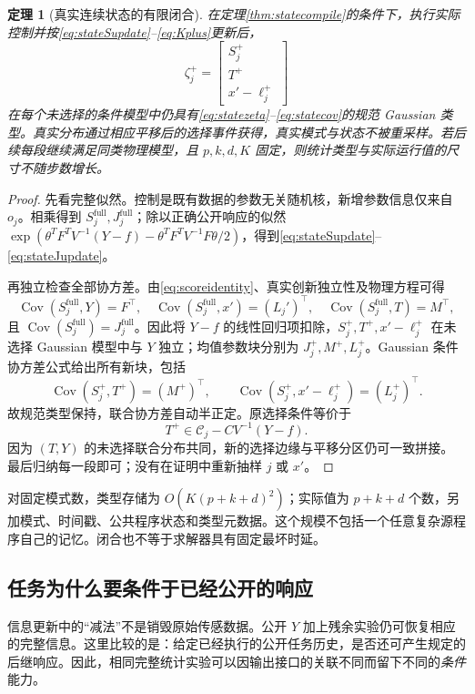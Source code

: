 \documentclass[UTF8,fontset=fandol,11pt,a4paper]{ctexart}
\DeclareMathOperator{\Cov}{Cov}\DeclareMathOperator{\im}{im}\DeclareMathOperator{\rank}{rank}
\newtheorem{theorem}{定理}[section]\newtheorem{lemma}[theorem]{引理}
\theoremstyle{definition}\newtheorem{definition}[theorem]{定义}\newtheorem{assumption}[theorem]{条件}
\numberwithin{equation}{section}
\begin{document}
\begin{theorem}[真实连续状态的有限闭合]
\label{thm:stateclosure}
在定理\ref{thm:statecompile}的条件下，执行实际控制并按\eqref{eq:stateSupdate}--\eqref{eq:Kplus}更新后，
\[
\zeta_j^+=\begin{bmatrix}S_j^+\\T^+\\x'-\ell_j^+\end{bmatrix}
\]
在每个未选择的条件模型中仍具有\eqref{eq:statezeta}--\eqref{eq:statecov}的规范 Gaussian 类型。真实分布通过相应平移后的选择事件获得，真实模式与状态不被重采样。若后续每段继续满足同类物理模型，且 $p,k,d,K$ 固定，则统计类型与实际运行值的尺寸不随步数增长。
\end{theorem}
\begin{proof}
先看完整似然。控制是既有数据的参数无关随机核，新增参数信息仅来自 $o_j$。相乘得到 $S_j^{\mathrm{full}},J_j^{\mathrm{full}}$；除以正确公开响应的似然 $\exp(\theta^TF^TV^{-1}(Y-f)-\theta^TF^TV^{-1}F\theta/2)$，得到\eqref{eq:stateSupdate}--\eqref{eq:stateJupdate}。

再独立检查全部协方差。由\eqref{eq:scoreidentity}、真实创新独立性及物理方程可得
\[
\Cov(S_j^{\mathrm{full}},Y)=F^\top,\quad
\Cov(S_j^{\mathrm{full}},x')=(L_j')^\top,\quad
\Cov(S_j^{\mathrm{full}},T)=M^\top,
\]
且 $\Cov(S_j^{\mathrm{full}})=J_j^{\mathrm{full}}$。因此将 $Y-f$ 的线性回归项扣除，$S_j^+,T^+,x'-\ell_j^+$ 在未选择 Gaussian 模型中与 $Y$ 独立；均值参数块分别为 $J_j^+,M^+,L_j^+$。Gaussian 条件协方差公式给出所有新块，包括
\[
\Cov(S_j^+,T^+)=(M^+)^\top,
\qquad\Cov(S_j^+,x'-\ell_j^+)=(L_j^+)^\top.
\]
故规范类型保持，联合协方差自动半正定。原选择条件等价于
\[
T^+\in\mathcal C_j-CV^{-1}(Y-f).
\]
因为 $(T,Y)$ 的未选择联合分布共同，新的选择边缘与平移分区仍可一致拼接。最后归纳每一段即可；没有在证明中重新抽样 $j$ 或 $x'$。
\end{proof}

对固定模式数，类型存储为 $O(K(p+k+d)^2)$；实际值为 $p+k+d$ 个数，另加模式、时间戳、公共程序状态和类型元数据。这个规模不包括一个任意复杂源程序自己的记忆。闭合也不等于求解器具有固定最坏时延。

\subsection{任务为什么要条件于已经公开的响应}
信息更新中的“减法”不是销毁原始传感数据。公开 $Y$ 加上残余实验仍可恢复相应的完整信息。这里比较的是：给定已经执行的公开任务历史，是否还可产生规定的后继响应。因此，相同完整统计实验可以因输出接口的关联不同而留下不同的\emph{条件}能力。
\end{document}
